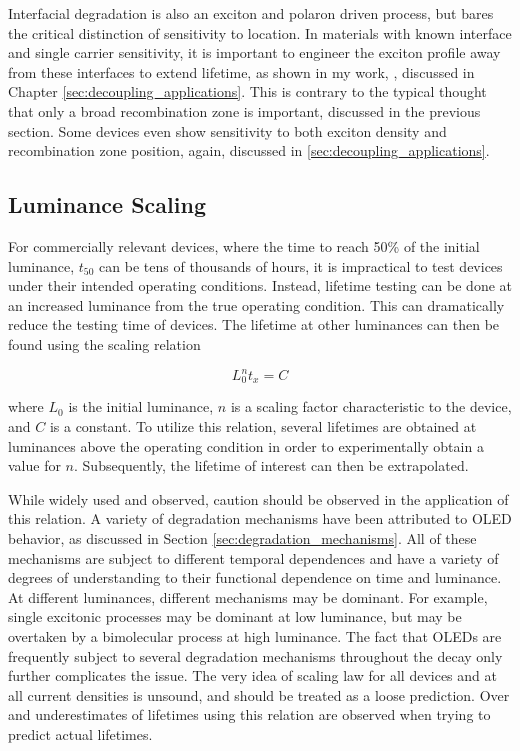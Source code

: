 \documentclass[../thesis.tex]{subfiles}
\begin{document}
Interfacial degradation is also an exciton and polaron driven process, but bares the critical distinction of sensitivity to location.  
In materials with known interface and single carrier sensitivity, it is important to engineer the exciton profile away from these interfaces to extend lifetime, as shown in my work, \textcite{Hershey2016}, discussed in Chapter \ref{sec:decoupling_applications}.
This is contrary to the typical thought that only a broad recombination zone is important, discussed in the previous section.
Some devices even show sensitivity to both exciton density and recombination zone position, again, discussed in \ref{sec:decoupling_applications}.







\subsection{Luminance Scaling}\label{sec:luminance_scaling}
For commercially relevant devices, where the time to reach 50\% of the initial luminance, $t_{50}$ can be tens of thousands of hours, it is impractical to test devices under their intended operating conditions.
Instead, lifetime testing can be done at an increased luminance from the true operating condition.\supercite{Scholz2015}
This can dramatically reduce the testing time of devices.
The lifetime at other luminances can then be found using the scaling relation

\begin{equation}
L_0^n t_x=C
\label{eqn:luminance_scaling}
\end{equation}

where $L_0$ is the initial luminance, $n$ is a scaling factor characteristic to the device, and $C$ is a constant.
To utilize this relation, several lifetimes are obtained at luminances above the operating condition in order to experimentally obtain a value for $n$.
Subsequently, the lifetime of interest can then be extrapolated.

While widely used and observed, caution should be observed in the application of this relation.  
A variety of degradation mechanisms have been attributed to OLED behavior, as discussed in Section \ref{sec:degradation_mechanisms}.
All of these mechanisms are subject to different temporal dependences and have a variety of degrees of understanding to their functional dependence on time and luminance.
At different luminances, different mechanisms may be dominant.
For example, single excitonic processes may be dominant at low luminance, but may be overtaken by a bimolecular process at high luminance.
The fact that OLEDs are frequently subject to several degradation mechanisms throughout the decay only further complicates the issue.
The very idea of scaling law for all devices and at all current densities is unsound, and should be treated as a loose prediction.
Over and underestimates of lifetimes using this relation are observed when trying to predict actual lifetimes.\supercite{Meerheim2006,Fry2005}
\end{document}
